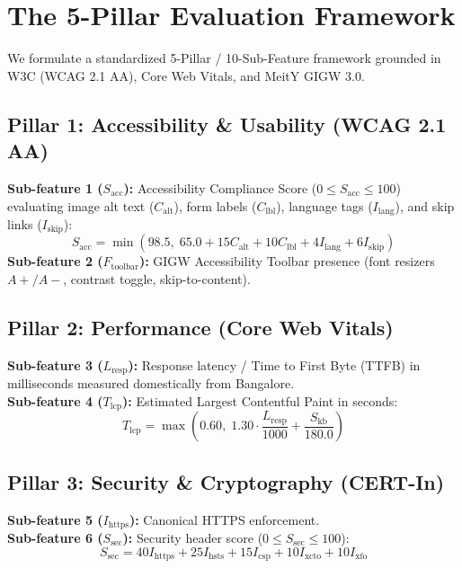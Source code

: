 \documentclass[conference]{IEEEtran}
\begin{document}
\section{The 5-Pillar Evaluation Framework}
We formulate a standardized 5-Pillar / 10-Sub-Feature framework grounded in W3C (WCAG 2.1 AA), Core Web Vitals, and MeitY GIGW 3.0.

\subsection{Pillar 1: Accessibility \& Usability (WCAG 2.1 AA)}
\textbf{Sub-feature 1 ($S_{\text{acc}}$):} Accessibility Compliance Score ($0 \le S_{\text{acc}} \le 100$) evaluating image alt text ($C_{\text{alt}}$), form labels ($C_{\text{lbl}}$), language tags ($I_{\text{lang}}$), and skip links ($I_{\text{skip}}$):
\begin{equation}
S_{\text{acc}} = \min\left(98.5, \; 65.0 + 15 C_{\text{alt}} + 10 C_{\text{lbl}} + 4 I_{\text{lang}} + 6 I_{\text{skip}}\right)
\end{equation}
\textbf{Sub-feature 2 ($F_{\text{toolbar}}$):} GIGW Accessibility Toolbar presence (font resizers $A+/A-$, contrast toggle, skip-to-content).

\subsection{Pillar 2: Performance (Core Web Vitals)}
\textbf{Sub-feature 3 ($L_{\text{resp}}$):} Response latency / Time to First Byte (TTFB) in milliseconds measured domestically from Bangalore.\\
\textbf{Sub-feature 4 ($T_{\text{lcp}}$):} Estimated Largest Contentful Paint in seconds:
\begin{equation}
T_{\text{lcp}} = \max\left(0.60, \; 1.30 \cdot \frac{L_{\text{resp}}}{1000} + \frac{S_{\text{kb}}}{180.0}\right)
\end{equation}

\subsection{Pillar 3: Security \& Cryptography (CERT-In)}
\textbf{Sub-feature 5 ($I_{\text{https}}$):} Canonical HTTPS enforcement.\\
\textbf{Sub-feature 6 ($S_{\text{sec}}$):} Security header score ($0 \le S_{\text{sec}} \le 100$):
\begin{equation}
S_{\text{sec}} = 40 I_{\text{https}} + 25 I_{\text{hsts}} + 15 I_{\text{csp}} + 10 I_{\text{xcto}} + 10 I_{\text{xfo}}
\end{equation}
\end{document}

